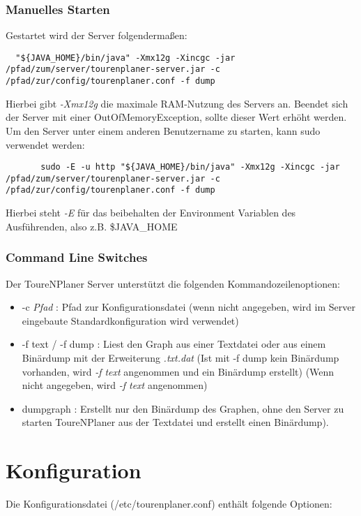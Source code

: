 \documentclass[ngerman,titlepage,parskip=true]{scrartcl}
\begin{document}
	\subsubsection{Manuelles Starten}
  Gestartet wird der Server folgenderma\ss{}en:
	\begin{lstlisting}
  "${JAVA_HOME}/bin/java" -Xmx12g -Xincgc -jar /pfad/zum/server/tourenplaner-server.jar -c /pfad/zur/config/tourenplaner.conf -f dump
	\end{lstlisting}
	Hierbei gibt \textit{-Xmx12g} die maximale RAM-Nutzung des Servers an. Beendet sich der Server mit einer OutOfMemoryException, sollte dieser Wert erh\"oht werden.
	Um den Server unter einem anderen Benutzername zu starten, kann sudo verwendet werden:
	\begin{lstlisting}
	   sudo -E -u http "${JAVA_HOME}/bin/java" -Xmx12g -Xincgc -jar /pfad/zum/server/tourenplaner-server.jar -c /pfad/zur/config/tourenplaner.conf -f dump
	\end{lstlisting}
  Hierbei steht \textit{-E} f\"ur das beibehalten der Environment Variablen des Ausf\"uhrenden, also z.B. \$JAVA_HOME


	\subsubsection{Command Line Switches}
	Der ToureNPlaner Server unterst\"utzt die folgenden Kommandozeilenoptionen:
	\begin{itemize}
	  \item -c \textit{Pfad} : Pfad zur Konfigurationsdatei (wenn nicht angegeben, wird im Server eingebaute Standardkonfiguration wird verwendet)
	  \item -f text / -f dump : Liest den Graph aus einer Textdatei oder aus einem Bin\"ardump mit der Erweiterung \textit{.txt.dat} (Ist mit -f dump kein Bin\"ardump vorhanden, wird \textit{-f text} angenommen und ein Bin\"ardump erstellt) (Wenn nicht angegeben, wird \textit{-f text} angenommen)
	 \item dumpgraph : Erstellt nur den Bin\"ardump des Graphen, ohne den Server zu starten
	  ToureNPlaner aus der Textdatei und erstellt einen Bin\"ardump).
	\end{itemize}

\section{Konfiguration}
Die Konfigurationsdatei (/etc/tourenplaner.conf) enth\"alt folgende Optionen:
\end{document}

